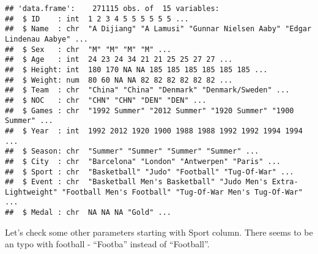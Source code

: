 \documentclass[
]{article}
\newenvironment{Shaded}{\begin{snugshade}}{\end{snugshade}}
\newcommand{\FunctionTok}[1]{\textcolor[rgb]{0.00,0.00,0.00}{#1}}
\newcommand{\NormalTok}[1]{#1}
\newcommand{\OtherTok}[1]{\textcolor[rgb]{0.56,0.35,0.01}{#1}}
\newcommand{\SpecialCharTok}[1]{\textcolor[rgb]{0.00,0.00,0.00}{#1}}
\begin{document}
\begin{verbatim}
## 'data.frame':    271115 obs. of  15 variables:
##  $ ID    : int  1 2 3 4 5 5 5 5 5 5 ...
##  $ Name  : chr  "A Dijiang" "A Lamusi" "Gunnar Nielsen Aaby" "Edgar Lindenau Aabye" ...
##  $ Sex   : chr  "M" "M" "M" "M" ...
##  $ Age   : int  24 23 24 34 21 21 25 25 27 27 ...
##  $ Height: int  180 170 NA NA 185 185 185 185 185 185 ...
##  $ Weight: num  80 60 NA NA 82 82 82 82 82 82 ...
##  $ Team  : chr  "China" "China" "Denmark" "Denmark/Sweden" ...
##  $ NOC   : chr  "CHN" "CHN" "DEN" "DEN" ...
##  $ Games : chr  "1992 Summer" "2012 Summer" "1920 Summer" "1900 Summer" ...
##  $ Year  : int  1992 2012 1920 1900 1988 1988 1992 1992 1994 1994 ...
##  $ Season: chr  "Summer" "Summer" "Summer" "Summer" ...
##  $ City  : chr  "Barcelona" "London" "Antwerpen" "Paris" ...
##  $ Sport : chr  "Basketball" "Judo" "Football" "Tug-Of-War" ...
##  $ Event : chr  "Basketball Men's Basketball" "Judo Men's Extra-Lightweight" "Football Men's Football" "Tug-Of-War Men's Tug-Of-War" ...
##  $ Medal : chr  NA NA NA "Gold" ...
\end{verbatim}

\begin{Shaded}
\end{Shaded}

Let's check some other parameters starting with Sport column. There
seems to be an typo with football - ``Footba'' instead of ``Football''.

\begin{Shaded}
\end{Shaded}
\end{document}
